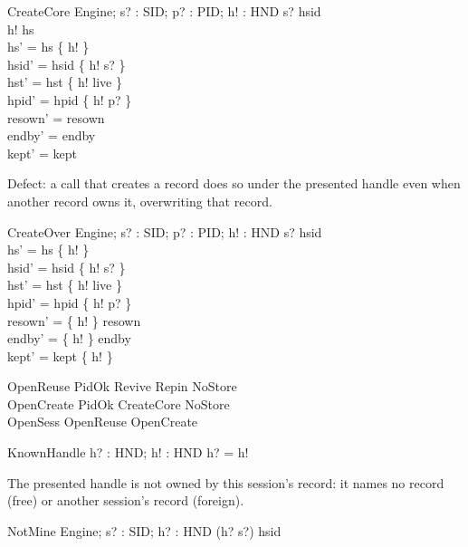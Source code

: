 \documentclass[a4paper,10pt,fleqn]{article}
\begin{document}
\begin{schema}{CreateCore}
  \Delta Engine; s? : SID; p? : PID; h! : HND
\where
  s? \notin \ran hsid \\
  h! \notin hs \\
  hs' = hs \cup \{ h! \} \\
  hsid' = hsid \cup \{ h! \mapsto s? \} \\
  hst' = hst \cup \{ h! \mapsto live \} \\
  hpid' = hpid \cup \{ h! \mapsto p? \} \\
  resown' = resown \\
  endby' = endby \\
  kept' = kept
\end{schema}

Defect: a call that creates a record does so under the presented handle even
when another record owns it, overwriting that record.

\begin{schema}{CreateOver}
  \Delta Engine; s? : SID; p? : PID; h! : HND
\where
  s? \notin \ran hsid \\
  hs' = hs \cup \{ h! \} \\
  hsid' = hsid \oplus \{ h! \mapsto s? \} \\
  hst' = hst \oplus \{ h! \mapsto live \} \\
  hpid' = hpid \oplus \{ h! \mapsto p? \} \\
  resown' = \{ h! \} \ndres resown \\
  endby' = \{ h! \} \ndres endby \\
  kept' = kept \setminus \{ h! \}
\end{schema}

\begin{zed}
  OpenReuse  PidOk \land Revive \land Repin \land NoStore \\
  OpenCreate  PidOk \land CreateCore \land NoStore \\
  OpenSess  OpenReuse \lor OpenCreate
\end{zed}

\begin{schema}{KnownHandle}
  h? : HND; h! : HND
\where
  h? = h!
\end{schema}

The presented handle is not owned by this session's record: it names no record
(free) or another session's record (foreign).

\begin{schema}{NotMine}
  Engine; s? : SID; h? : HND
\where
  (h? \mapsto s?) \notin hsid
\end{schema}
\end{document}
